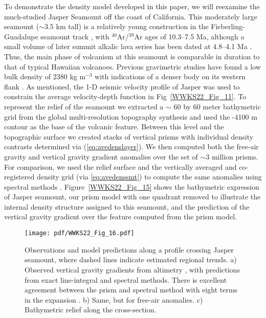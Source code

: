 To demonstrate the density model developed in this paper, we will reexamine the much-studied Jasper Seamount off
the coast of California. This moderately large seamount ($\sim 3.5$ km tall) is a relatively young construction
in the Fieberling-Guadalupe seamount track \citep{B1989}, with $^{40}$Ar/$^{39}$Ar ages of 10.3--7.5 Ma, although a
small volume of later summit alkalic lava series has been dated at 4.8--4.1 Ma \citep{PSG91}. Thus, the main phase
of volcanism at this seamount is comparable in duration to that of typical Hawaiian volcanoes.  Previous gravimetric
studies have found a low bulk density of 2380 kg m$^{-3}$ with indications of a denser body on its western flank
\citep{H1991}. As mentioned, the 1-D seismic velocity profile of Jasper \citep{H1994} was used to constrain the average
velocity-depth function in Fig~\ref{WWKS22_Fig_11}. To represent the relief of the seamount we extracted a
$\sim$ 60 by 60 meter bathymetric grid from the global multi-resolution topography synthesis \citep{R2009} and used
the -4100 m contour as the base of the volcanic feature.  Between this level and the topographic surface we created
stacks of vertical prisms with individual density contrasts determined via (\ref{eq:avedenslayer}).
We then computed both the free-air gravity and vertical gravity gradient anomalies over the set of $\sim 3$ million
prisms. For comparison, we used the relief surface and the vertically averaged and co-registered density grid
(via \ref{eq:avedenssmt}) to compute the same anomalies using spectral methods \citep{P1972}.
Figure~\ref{WWKS22_Fig_15} shows the bathymetric expression of Jasper seamount, our prism model with one quadrant
removed to illustrate the internal density structure assigned to this seamount, and the prediction of the
vertical gravity gradient over the feature computed from the prism model.

\begin{figure}
\centering
\texttt{[image: pdf/WWKS22\_Fig\_16.pdf]}
\caption{Observations and model predictions along a profile crossing Jasper seamount, where dashed lines indicate
estimated regional trends. a) Observed vertical gravity gradients from altimetry \citep{Setal2021}, with predictions
from exact line-integral and spectral methods.  There is excellent agreement between the prism and spectral method
with eight terms in the expansion \citep{P1972}. b) Same, but for free-air anomalies. c) Bathymetric relief along the
cross-section.}
\label{WWKS22_Fig_16}
\end{figure}

